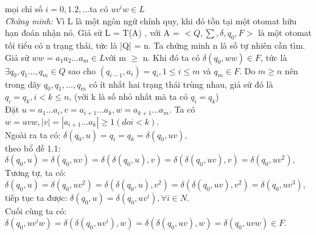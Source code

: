 \begin{flushleft}
mọi chỉ số $i = 0, 1. 2,... $ta có $uv^iw \in L$\\
\textit{Chứng minh: }Vì L là một ngôn ngữ chính quy, khi đó tồn tại một otomat hữu hạn đoán nhận
nó. Giả sử L = T(A) , với A = $<Q, \sum, \delta, q_0, F>$ là một otomat tối tiểu có n trạng thái, tức là |Q|
= n. Ta chứng minh n là số tự nhiên cần tìm.\\
Giả sử $ww = a_1a_2...a_m \in L $với m $\ge$ n. Khi đó ta có $\delta(q_0, ww) \in F$, tức là $\exists q_0, q_1..., q_m \in Q$ sao
cho $(q_{i-1}, a_i) = q_i, 1 \le i \le m$ và $q_m \in F$. Do $m \ge n$ nên trong dãy $q_0, q_1,..., q_m$ có ít nhất hai
trạng thái trùng nhau, giả sử đó là $q_i = q_k, i < k \le n$, (với k là số nhỏ nhất mà ta có $q_i = q_k$)\\
\hspace{10mm} Đặt $u = a_1...a_i, v = a_{i+1}...a_k, w = a_{k+1}...a_m$. Ta có $w = uvw, |v| = |a_{i+1}...a_k| \ge 1 (do i<k).$\\
Ngoài ra ta có:\hspace{10mm} $\delta(q_0, u) = q_i = q_k = \delta(q_0, uv),$\\
theo bổ đề 1.1:\hspace{10mm} $\delta(q_0, u) = \delta(q_0, uv) = \delta(\delta(q_0, u), v) = \delta(\delta(q_0, uv), v) = \delta(q_0, uv^2),$\\
Tương tự, ta có:\hspace{10mm} $\delta(q_0, u) = \delta(q_0, uv^2) = \delta(\delta(q_0, u), v^2) = \delta(\delta(q_0, uv), v^2) = \delta(q_0, uv^3),$\\
tiếp tục ta được:\hspace{10mm} $\delta(q_0, u) = \delta(q_0, uv^i), \forall i \in N.$\\
Cuối cùng ta có:\hspace{10mm} $\delta(q_0, uv^iw) = \delta(\delta(q_0, uv^i), w) = \delta(\delta(q_0, uv), w) = \delta(q_0, uvw) \in F$.


\end{flushleft}
